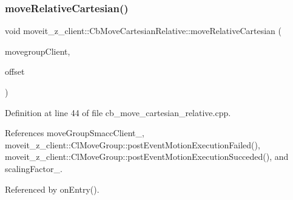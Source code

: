\subsubsection{\texorpdfstring{move\+Relative\+Cartesian()}{moveRelativeCartesian()}}
{\footnotesize\ttfamily void moveit\+\_\+z\+\_\+client\+::\+Cb\+Move\+Cartesian\+Relative\+::move\+Relative\+Cartesian (\begin{DoxyParamCaption}\item[{moveit\+::planning\+\_\+interface\+::\+Move\+Group\+Interface $\ast$}]{movegroup\+Client,  }\item[{geometry\+\_\+msgs\+::\+Vector3 \&}]{offset }\end{DoxyParamCaption})}



Definition at line 44 of file cb\+\_\+move\+\_\+cartesian\+\_\+relative.\+cpp.



References move\+Group\+Smacc\+Client\+\_\+, moveit\+\_\+z\+\_\+client\+::\+Cl\+Move\+Group\+::post\+Event\+Motion\+Execution\+Failed(), moveit\+\_\+z\+\_\+client\+::\+Cl\+Move\+Group\+::post\+Event\+Motion\+Execution\+Succeded(), and scaling\+Factor\+\_\+.



Referenced by on\+Entry().


